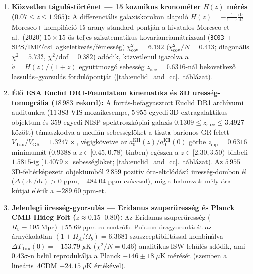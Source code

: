 \documentclass[11pt,a4paper]{article}
\theoremstyle{remark}
\begin{document}
\begin{enumerate}
  \item \textbf{K\"ozvetlen t\'agul\'ast\"ort\'enet --- 15 kozmikus kronom\'eter $H(z)$ m\'er\'es ($0.07 \le z \le 1.965$):} A differenci\'alis galaxiskorokon alapul\'o $H(z) = -\frac{1}{1+z}\frac{\mathrm{d}z}{\mathrm{d}t}$ Moresco+ kompil\'aci\'o \cite{Moresco2022CC} 15 arany-standard pontj\'an a hivatalos Moresco et al.\ (2020) $15\times 15$-\"os teljes szisztematikus kovarianciam\'atrixszal (\texttt{BC03} + SPS/IMF/csillagkeletkez\'es/f\'emess\'eg) $\chi^2_{\mathrm{cov}} = 6.192$ ($\chi^2_{\mathrm{cov}}/N = 0.413$; diagon\'alis $\chi^2 = 5.732$, $\chi^2/\mathrm{dof} = 0.382$) ad\'odik, k\"ozvetlen\"ul igazolva a $\dot{a} = H(z)/(1+z)$ egy\"uttmozg\'o sebess\'eg $z_{\mathrm{acc}} = 0.6316$-n\'al bek\"ovetkez\H{o} lassul\'as--gyorsul\'as fordul\'opontj\'at (\ref{tab:euclid_and_cc}.\ t\'abl\'azat).
  \item \textbf{\'El\H{o} ESA Euclid DR1-Foundation kinematika \'es 3D \"uress\'eg-tomogr\'afia ($18\,983$ rekord):} A forr\'as-befagyasztott Euclid DR1 arch\'ivumi auditunkra \cite{EuclidDR1Archive2026,JolcsakTauPaper20Euclid2026} ($11\,383$ VIS mozaikcsempe, $5\,955$ egyedi 3D extragalaktikus objektum \'es $359$ egyedi NISP spektroszk\'opiai galaxis $0.1309 \le z_{\mathrm{spec}} \le 3.4927$ k\"oz\"ott) t\'amaszkodva a medi\'an sebess\'egl\"oket a tiszta barionos GR felett $V_{\mathrm{Tau}}/V_{\mathrm{GR}} = 1.3247\times$, v\'egigk\"ovetve az $a_0^{\mathrm{KH}}(z)/a_0^{\mathrm{KH}}(0)$ g\"orbe $z_{\mathrm{dip}} = 0.6316$ minimum\'at ($0.9388$ a $z \in [0.45, 0.78)$ binben) eg\'eszen a $z \in [2.30, 3.50)$ binbeli $1.5815$-ig ($1.4079\times$ sebess\'egl\"oket; \ref{tab:euclid_and_cc}.\ t\'abl\'azat). Az $5\,955$ 3D-felt\'erk\'epezett objektumb\'ol $2\,859$ pozit\'iv \'ora-eltol\'od\'as\'u \"uress\'eg-dombon \'el ($\Delta(\mathrm{d}\tau/\mathrm{d}t) > 0\;\mathrm{ppm}$, $+484.04\;\mathrm{ppm}$ cs\'uccsal), m\'ig a halmazok m\'ely \'ora-k\'utjai el\'erik a $-289.60\;\mathrm{ppm}$-et.
  \item \textbf{Jelenlegi \"uress\'eg-gyorsul\'as --- Eridanus szuper\"uress\'eg \'es Planck CMB Hideg Folt ($z \approx 0.15$--$0.80$):} Az Eridanus szuper\"uress\'eg ($R_v = 195\;\mathrm{Mpc}$) $+55.69\;\mathrm{ppm}$-es centr\'alis Poisson-\'oragyorsul\'as\'at az \'arny\'ekolatlan $(1 + \Omega_A/\Omega_b) = 6.3681$ szuszceptibilit\'assal kombin\'alva $\Delta T_{\mathrm{Tau}}(0) = -153.79\;\mu\mathrm{K}$ ($\chi^2/N = 0.46$) analitikus ISW-leh\H{u}l\'es ad\'odik, ami \textbf{$0.43\sigma$}-n bel\"ul reproduk\'alja a Planck $-146 \pm 18\;\mu\mathrm{K}$ m\'er\'es\'et \cite{Kovacs2022Eridanus} (szemben a line\'aris $\Lambda\mathrm{CDM}$ $-24.15\;\mu\mathrm{K}$ \'ert\'ek\'evel).
\end{enumerate}
\end{document}
